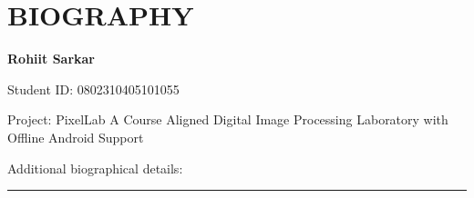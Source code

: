 \chapter*{BIOGRAPHY}\noindent\textbf{Rohiit Sarkar}\par Student ID: 0802310405101055\par\medskip Project: PixelLab A Course Aligned Digital Image Processing Laboratory with Offline Android Support\par\bigskip Additional biographical details: \rule{5cm}{0.4pt}